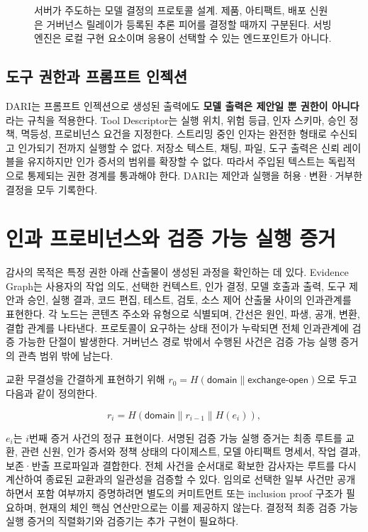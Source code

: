 \documentclass[10pt]{article}
\renewcommand{\emph}[1]{\textbf{#1}}
\begin{document}
\begin{figure}[H]
  \centering
  
  \caption{서버가 주도하는 모델 결정의 프로토콜 설계. 제품, 아티팩트, 배포 신원은 거버넌스 릴레이가 등록된 추론 피어를 결정할 때까지 구분된다. 서빙 엔진은 로컬 구현 요소이며 응용이 선택할 수 있는 엔드포인트가 아니다.}
  \label{fig:model-identity}
\end{figure}

\subsection{도구 권한과 프롬프트 인젝션}

DARI는 프롬프트 인젝션으로 생성된 출력에도 \emph{모델 출력은 제안일 뿐 권한이 아니다}라는 규칙을 적용한다. Tool Descriptor는 실행 위치, 위험 등급, 인자 스키마, 승인 정책, 멱등성, 프로비넌스 요건을 지정한다. 스트리밍 중인 인자는 완전한 형태로 수신되고 인가되기 전까지 실행할 수 없다. 저장소 텍스트, 채팅, 파일, 도구 출력은 신뢰 레이블을 유지하지만 인가 증서의 범위를 확장할 수 없다. 따라서 주입된 텍스트는 독립적으로 통제되는 권한 경계를 통과해야 한다. DARI는 제안과 실행을 허용·변환·거부한 결정을 모두 기록한다.

\section{인과 프로비넌스와 검증 가능 실행 증거}

감사의 목적은 특정 권한 아래 산출물이 생성된 과정을 확인하는 데 있다. Evidence Graph는 사용자의 작업 의도, 선택한 컨텍스트, 인가 결정, 모델 호출과 출력, 도구 제안과 승인, 실행 결과, 코드 편집, 테스트, 검토, 소스 제어 산출물 사이의 인과관계를 표현한다. 각 노드는 콘텐츠 주소와 유형으로 식별되며, 간선은 원인, 파생, 공개, 변환, 결합 관계를 나타낸다. 프로토콜이 요구하는 상태 전이가 누락되면 전체 인과관계에 검증 가능한 단절이 발생한다. 거버넌스 경로 밖에서 수행된 사건은 검증 가능 실행 증거의 관측 범위 밖에 남는다.

교환 무결성을 간결하게 표현하기 위해 $r_0=H(\textsf{domain}\parallel\textsf{exchange-open})$으로 두고 다음과 같이 정의한다.

\begin{equation}
r_i = H(\textsf{domain}\parallel r_{i-1}\parallel H(e_i)),
\end{equation}

$e_i$는 $i$번째 증거 사건의 정규 표현이다. 서명된 검증 가능 실행 증거는 최종 루트를 교환, 관련 신원, 인가 증서와 정책 상태의 다이제스트, 모델 아티팩트 명세서, 작업 결과, 보존·반출 프로파일과 결합한다. 전체 사건을 순서대로 확보한 감사자는 루트를 다시 계산하여 종료된 교환과의 일관성을 검증할 수 있다. 임의로 선택한 일부 사건만 공개하면서 포함 여부까지 증명하려면 별도의 커미트먼트 또는 inclusion proof 구조가 필요하며, 현재의 체인 핵심 연산만으로는 이를 제공하지 않는다. 결정적 최종 검증 가능 실행 증거의 직렬화기와 검증기는 추가 구현이 필요하다.
\end{document}
